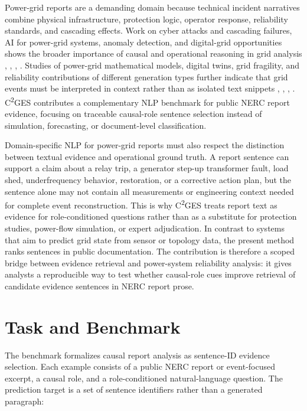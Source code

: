 \documentclass{ieeeaccess}
\begin{document}
Power-grid reports are a demanding domain because technical incident narratives combine physical infrastructure, protection logic, operator response, reliability standards, and cascading effects. Work on cyber attacks and cascading failures, AI for power-grid systems, anomaly detection, and digital-grid opportunities shows the broader importance of causal and operational reasoning in grid analysis \cite{rajkumar2023cyber}, \cite{sahani2023machine}, \cite{madabhushi2023survey}, \cite{xie2022massively}. Studies of power-grid mathematical models, digital twins, grid fragility, and reliability contributions of different generation types further indicate that grid events must be interpreted in context rather than as isolated text snippets \cite{srinivasan2023artificial}, \cite{ranawaka2024leveraging}, \cite{karagiannakis2024fragility}, \cite{ramirezmeyers2021different}. C\textsuperscript{2}GES contributes a complementary NLP benchmark for public NERC report evidence, focusing on traceable causal-role sentence selection instead of simulation, forecasting, or document-level classification.

Domain-specific NLP for power-grid reports must also respect the distinction between textual evidence and operational ground truth. A report sentence can support a claim about a relay trip, a generator step-up transformer fault, load shed, underfrequency behavior, restoration, or a corrective action plan, but the sentence alone may not contain all measurements or engineering context needed for complete event reconstruction. This is why C\textsuperscript{2}GES treats report text as evidence for role-conditioned questions rather than as a substitute for protection studies, power-flow simulation, or expert adjudication. In contrast to systems that aim to predict grid state from sensor or topology data, the present method ranks sentences in public documentation. The contribution is therefore a scoped bridge between evidence retrieval and power-system reliability analysis: it gives analysts a reproducible way to test whether causal-role cues improve retrieval of candidate evidence sentences in NERC report prose.

\section{Task and Benchmark}

\label{sec:task_and_benchmark}

The benchmark formalizes causal report analysis as sentence-ID evidence selection. Each example consists of a public NERC report or event-focused excerpt, a causal role, and a role-conditioned natural-language question. The prediction target is a set of sentence identifiers rather than a generated paragraph:
\end{document}
